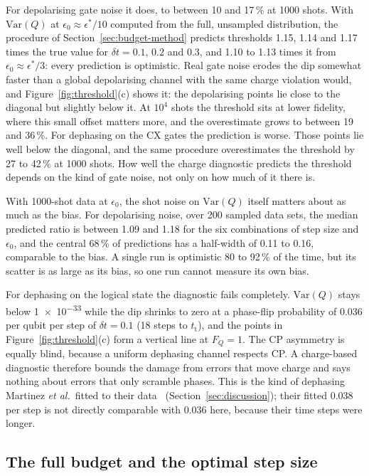 For depolarising gate noise it does, to between 10 and 17\,\% at 1000 shots.
With $\mathrm{Var}(Q)$ at $\epsilon_0 \approx \epsilon^\ast/10$ computed from
the full, unsampled distribution, the procedure of
Section~\ref{sec:budget-method} predicts thresholds 1.15, 1.14 and 1.17 times
the true value for $\delta t = 0.1$, $0.2$ and $0.3$, and 1.10 to 1.13 times it
from $\epsilon_0 \approx \epsilon^\ast/3$: every prediction is optimistic.
Real gate noise erodes the dip somewhat faster than a global depolarising
channel with the same charge violation would, and Figure~\ref{fig:threshold}(c)
shows it: the depolarising points lie close to the diagonal but slightly below
it. At $10^4$ shots the threshold sits at lower fidelity, where this small offset
matters more, and the overestimate grows to between 19 and 36\,\%. For
dephasing on the CX gates the prediction is worse. Those points lie well below
the diagonal, and the same procedure overestimates the threshold by 27 to
42\,\% at 1000 shots. How well the charge diagnostic predicts the threshold
depends on the kind of gate noise, not only on how much of it there is.

With 1000-shot data at $\epsilon_0$, the shot noise on $\mathrm{Var}(Q)$ itself
matters about as much as the bias. For depolarising noise, over 200 sampled
data sets, the median predicted ratio is between 1.09 and 1.18 for the six
combinations of step size and $\epsilon_0$, and the central 68\,\% of
predictions has a half-width of 0.11 to 0.16, comparable to the bias. A single
run is optimistic 80 to 92\,\% of the time, but its scatter is as large as its
bias, so one run cannot measure its own bias.

For dephasing on the logical state the diagnostic fails completely.
$\mathrm{Var}(Q)$ stays below \num{1e-33} while the dip shrinks to zero at a
phase-flip probability of 0.036 per qubit per step of $\delta t = 0.1$ (18 steps
to $t_{\mathrm{t}}$), and the points in
Figure~\ref{fig:threshold}(c) form a vertical line at $F_Q = 1$. The CP
asymmetry is equally blind, because a uniform dephasing channel respects CP. A
charge-based diagnostic therefore bounds the damage from errors that move charge
and says nothing about errors that only scramble phases. This is the kind of
dephasing Martinez \emph{et al.}\ fitted to their data~\cite{martinez2016}
(Section~\ref{sec:discussion}); their fitted 0.038 per step is not directly
comparable with 0.036 here, because their time steps were longer.

\subsection{The full budget and the optimal step size}

